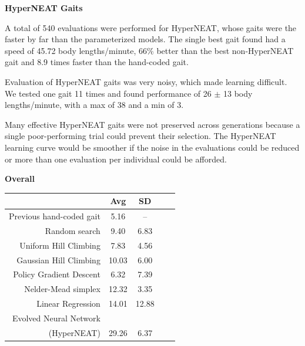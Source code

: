 \documentclass[portrait,final]{baposter}
\begin{document}
\begin{poster}
{


\textbf{HyperNEAT Gaits}
\vspace{.5em}

\noindent A total of 540 evaluations were performed for HyperNEAT, whose gaits
were the faster by far than the parameterized models.  The single best
gait found had a speed of 45.72 body lengths/minute, 66\% better than
the best non-HyperNEAT gait and 8.9 times faster than the hand-coded
gait.

Evaluation of HyperNEAT gaits was very noisy, which made learning
difficult. We tested one gait 11 times and found performance of 26
$\pm$ 13 body lengths/minute, with a max of 38 and a min of 3.

\vspace{.5em}

Many effective HyperNEAT gaits were not preserved across generations
because a single poor-performing trial could prevent their
selection. The HyperNEAT learning curve would be smoother if the noise
in the evaluations could be reduced or more than one evaluation per
individual could be afforded.


\textbf{Overall}
\vspace{.5em}


{\scriptsize
\begin{center}
\begin{tabular}{|r|c|c|c||c|}
\hline
                                         & Avg & SD \\
\hline                                    
\hline                                    
Previous hand-coded gait                 & 5.16   &   --     \\
\hline
Random search                            & 9.40   &   6.83   \\
\hline
Uniform Hill Climbing             & 7.83   &   4.56   \\
\hline
Gaussian Hill Climbing            & 10.03  &   6.00   \\
\hline
Policy Gradient Descent                  & 6.32   &   7.39   \\
\hline
Nelder-Mead simplex                      & 12.32  &   3.35   \\
\hline
Linear Regression                        & 14.01  &  12.88   \\
\hline
Evolved Neural Network              &        &          \\
(HyperNEAT)                              & 29.26  &   6.37   \\
\hline
\end{tabular}
\vspace{.5em}\\
  
\end{center}
}

}
\end{poster}
\end{document}
